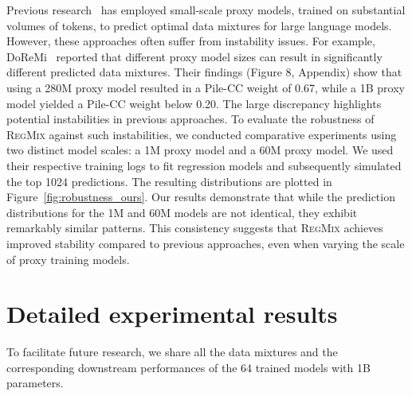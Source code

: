 \documentclass{article}
\theoremstyle{definition}
\theoremstyle{remark}
\newcommand{\ourmethod}{\textsc{RegMix}\xspace}
\begin{document}
Previous research~\citep{xie2023doremi,fan2023doge,albalak2023efficient} has employed small-scale proxy models, trained on substantial volumes of tokens, to predict optimal data mixtures for large language models.
However, these approaches often suffer from instability issues.
For example, DoReMi~\citep{xie2023doremi} reported that different proxy model sizes can result in significantly different predicted data mixtures.
Their findings (Figure 8, Appendix) show that using a 280M proxy model resulted in a Pile-CC weight of 0.67, while a 1B proxy model yielded a Pile-CC weight below 0.20.
The large discrepancy highlights potential instabilities in previous approaches.
To evaluate the robustness of \ourmethod against such instabilities, we conducted comparative experiments using two distinct model scales: a 1M proxy model and a 60M proxy model. We used their respective training logs to fit regression models and subsequently simulated the top 1024 predictions. The resulting distributions are plotted in Figure~\ref{fig:robustness_ours}.
Our results demonstrate that while the prediction distributions for the 1M and 60M models are not identical, they exhibit remarkably similar patterns. This consistency suggests that \ourmethod achieves improved stability compared to previous approaches, even when varying the scale of proxy training models.

\section{Detailed experimental results}\label{appendix:all_model_results}

To facilitate future research, we share all the data mixtures and the corresponding downstream performances of the 64 trained models with 1B parameters.
\end{document}
